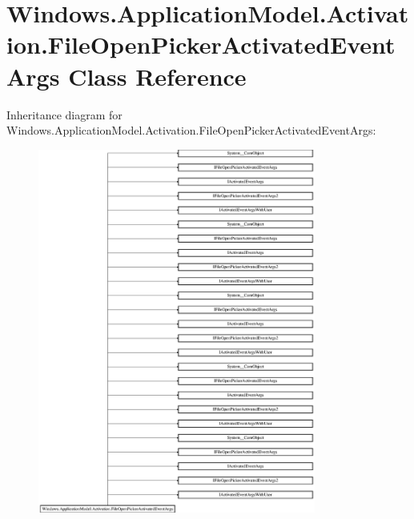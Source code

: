 \hypertarget{class_windows_1_1_application_model_1_1_activation_1_1_file_open_picker_activated_event_args}{}\section{Windows.\+Application\+Model.\+Activation.\+File\+Open\+Picker\+Activated\+Event\+Args Class Reference}
\label{class_windows_1_1_application_model_1_1_activation_1_1_file_open_picker_activated_event_args}
Inheritance diagram for Windows.\+Application\+Model.\+Activation.\+File\+Open\+Picker\+Activated\+Event\+Args\+:\begin{figure}[H]
\begin{center}
\leavevmode
\includegraphics[height=12.000000cm]{class_windows_1_1_application_model_1_1_activation_1_1_file_open_picker_activated_event_args}
\end{center}
\end{figure}
